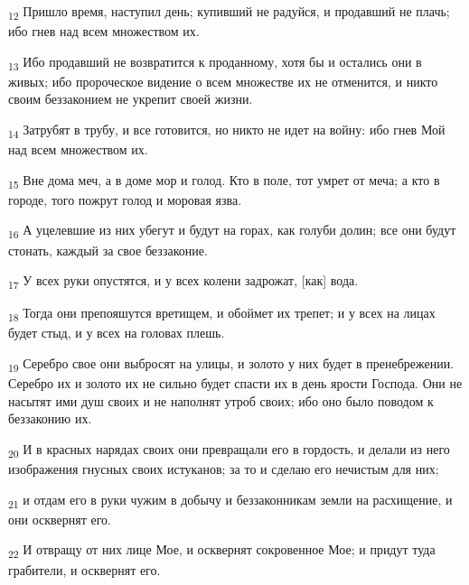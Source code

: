 \begin{tcolorbox}
\textsubscript{12} Пришло время, наступил день; купивший не радуйся, и продавший не плачь; ибо гнев над всем множеством их.
\end{tcolorbox}
\begin{tcolorbox}
\textsubscript{13} Ибо продавший не возвратится к проданному, хотя бы и остались они в живых; ибо пророческое видение о всем множестве их не отменится, и никто своим беззаконием не укрепит своей жизни.
\end{tcolorbox}
\begin{tcolorbox}
\textsubscript{14} Затрубят в трубу, и все готовится, но никто не идет на войну: ибо гнев Мой над всем множеством их.
\end{tcolorbox}
\begin{tcolorbox}
\textsubscript{15} Вне дома меч, а в доме мор и голод. Кто в поле, тот умрет от меча; а кто в городе, того пожрут голод и моровая язва.
\end{tcolorbox}
\begin{tcolorbox}
\textsubscript{16} А уцелевшие из них убегут и будут на горах, как голуби долин; все они будут стонать, каждый за свое беззаконие.
\end{tcolorbox}
\begin{tcolorbox}
\textsubscript{17} У всех руки опустятся, и у всех колени задрожат, [как] вода.
\end{tcolorbox}
\begin{tcolorbox}
\textsubscript{18} Тогда они препояшутся вретищем, и обоймет их трепет; и у всех на лицах будет стыд, и у всех на головах плешь.
\end{tcolorbox}
\begin{tcolorbox}
\textsubscript{19} Серебро свое они выбросят на улицы, и золото у них будет в пренебрежении. Серебро их и золото их не сильно будет спасти их в день ярости Господа. Они не насытят ими душ своих и не наполнят утроб своих; ибо оно было поводом к беззаконию их.
\end{tcolorbox}
\begin{tcolorbox}
\textsubscript{20} И в красных нарядах своих они превращали его в гордость, и делали из него изображения гнусных своих истуканов; за то и сделаю его нечистым для них;
\end{tcolorbox}
\begin{tcolorbox}
\textsubscript{21} и отдам его в руки чужим в добычу и беззаконникам земли на расхищение, и они осквернят его.
\end{tcolorbox}
\begin{tcolorbox}
\textsubscript{22} И отвращу от них лице Мое, и осквернят сокровенное Мое; и придут туда грабители, и осквернят его.
\end{tcolorbox}
